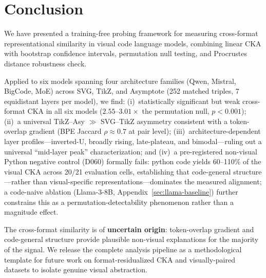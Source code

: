 
\section{Conclusion}
\label{sec:conclusion}

We have presented a training-free probing framework for measuring cross-format representational similarity in visual code language models, combining linear CKA with bootstrap confidence intervals, permutation null testing, and Procrustes distance robustness check.

Applied to six models spanning four architecture families (Qwen, Mistral, BigCode, MoE) across SVG, TikZ, and Asymptote (252 matched triples, 7 equidistant layers per model), we find:
(i)~statistically significant but weak cross-format CKA in all six models ($2.55$--$3.01\times$ the permutation null, $p < 0.001$);
(ii)~a universal TikZ--Asy $\gg$ SVG--TikZ asymmetry consistent with a token-overlap gradient (BPE Jaccard $\rho \approx 0.7$ at pair level);
(iii)~architecture-dependent layer profiles---inverted-U, broadly rising, late-plateau, and bimodal---ruling out a universal ``mid-layer peak'' characterization; and
(iv)~a pre-registered non-visual Python negative control (D060) formally fails: python code yields 60--110\% of the visual CKA across 20/21 evaluation cells, establishing that code-general structure---rather than visual-specific representations---dominates the measured alignment; a code-naive ablation (Llama-3-8B, Appendix~\ref{sec:llama-baseline}) further constrains this as a permutation-detectability phenomenon rather than a magnitude effect.

The cross-format similarity is of \textbf{uncertain origin}: token-overlap gradient and code-general structure provide plausible non-visual explanations for the majority of the signal.
We release the complete analysis pipeline as a methodological template for future work on format-residualized CKA and visually-paired datasets to isolate genuine visual abstraction.
